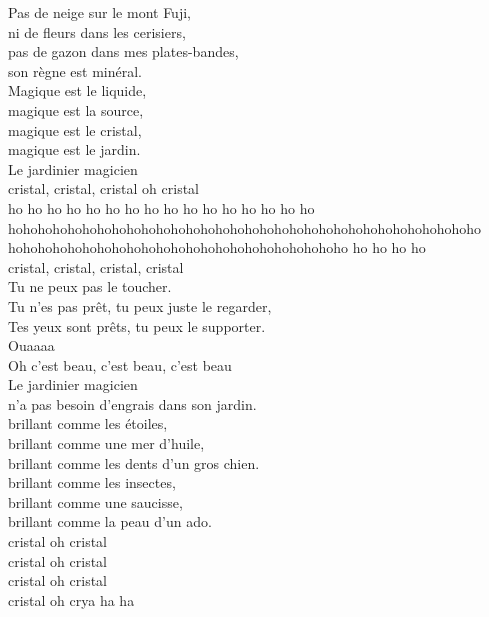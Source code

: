 \documentclass{42}
\begin{document}
	\begin{center}
	Pas de neige sur le mont Fuji,\\
	ni de fleurs dans les cerisiers,\\
	pas de gazon dans mes plates-bandes,\\
	son règne est minéral.\\
	\vspace{2mm}
	Magique est le liquide,\\
	magique est la source,\\
	magique est le cristal,\\
	magique est le jardin.\\
	\vspace{2mm}
	Le jardinier magicien\\
	cristal, cristal, cristal oh cristal\\
	ho ho ho ho ho ho ho ho ho ho ho ho ho ho ho ho\\
	hohohohohohohohohohohohohohohohohohohohohohohohohohohohohohohoho\\
	hohohohohohohohohohohohohohohohohohohohohohoho ho ho ho ho\\
	\vspace{2mm}
	cristal, cristal, cristal, cristal\\
	Tu ne peux pas le toucher.\\
	Tu n'es pas prêt, tu peux juste le regarder,\\
	Tes yeux sont prêts, tu peux le supporter.\\
	Ouaaaa\\
	Oh c'est beau, c'est beau, c'est beau\\
	\vspace{2mm}
	Le jardinier magicien\\
	n'a pas besoin d'engrais dans son jardin.\\
	brillant comme les étoiles,\\
	brillant comme une mer d'huile,\\
	brillant comme les dents d'un gros chien.\\
	\vspace{2mm}
	brillant comme les insectes,\\
	brillant comme une saucisse,\\
	brillant comme la peau d'un ado.\\
	\vspace{2mm}
	cristal oh cristal\\
	cristal oh cristal\\
	cristal oh cristal\\
	cristal oh crya ha ha\\
	\end{center}
\end{document}
